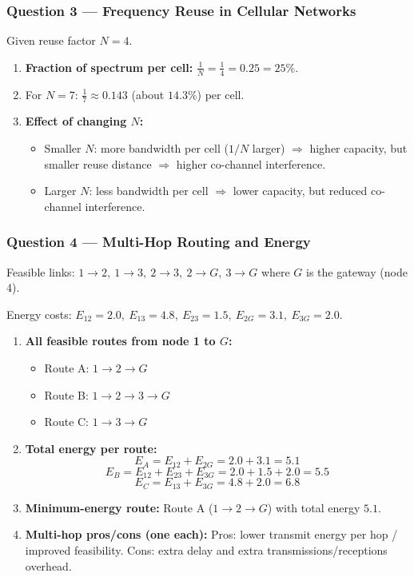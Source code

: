 \documentclass[11pt,a4paper]{article}
\begin{document}
\subsubsection*{Question 3 --- Frequency Reuse in Cellular Networks}
Given reuse factor $N=4$.

\begin{enumerate}[label=\alph*.]
    \item \textbf{Fraction of spectrum per cell:} $\frac{1}{N}=\frac{1}{4}=0.25=25\%$.
    \item For $N=7$: $\frac{1}{7}\approx 0.143$ (about $14.3\%$) per cell.
    \item \textbf{Effect of changing $N$:}
    \begin{itemize}
        \item Smaller $N$: more bandwidth per cell ($1/N$ larger) $\Rightarrow$ higher capacity, but smaller reuse distance $\Rightarrow$ higher co-channel interference.
        \item Larger $N$: less bandwidth per cell $\Rightarrow$ lower capacity, but reduced co-channel interference.
    \end{itemize}
\end{enumerate}

\subsubsection*{Question 4 --- Multi-Hop Routing and Energy}
Feasible links:
$1\to 2,\ 1\to 3,\ 2\to 3,\ 2\to G,\ 3\to G$ where $G$ is the gateway (node 4).

Energy costs:
$E_{12}=2.0,\ E_{13}=4.8,\ E_{23}=1.5,\ E_{2G}=3.1,\ E_{3G}=2.0$.

\begin{enumerate}[label=\alph*.]
    \item \textbf{All feasible routes from node 1 to $G$:}
    \begin{itemize}
        \item Route A: $1\to 2\to G$
        \item Route B: $1\to 2\to 3\to G$
        \item Route C: $1\to 3\to G$
    \end{itemize}
    \item \textbf{Total energy per route:}
    \[
    E_A = E_{12}+E_{2G}=2.0+3.1=5.1
    \]
    \[
    E_B = E_{12}+E_{23}+E_{3G}=2.0+1.5+2.0=5.5
    \]
    \[
    E_C = E_{13}+E_{3G}=4.8+2.0=6.8
    \]
    \item \textbf{Minimum-energy route:} Route A ($1\to 2\to G$) with total energy $5.1$.
    \item \textbf{Multi-hop pros/cons (one each):} Pros: lower transmit energy per hop / improved feasibility. Cons: extra delay and extra transmissions/receptions overhead.
\end{enumerate}
\end{document}
